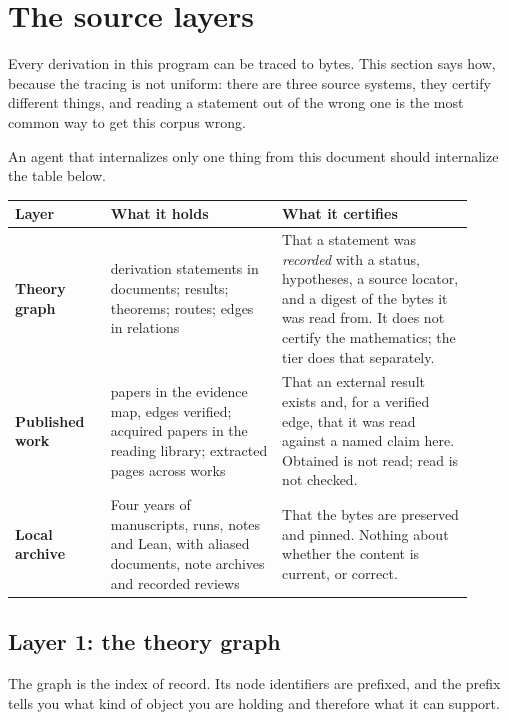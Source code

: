 \section{The source layers}
\label{sec:sources}

Every derivation in this program can be traced to bytes. This section
says how, because the tracing is not uniform: there are three source
systems, they certify different things, and reading a statement out of
the wrong one is the most common way to get this corpus wrong.

An agent that internalizes only one thing from this document should
internalize the table below.

\begin{center}
\begin{tabular}{@{}p{0.19\linewidth} p{0.34\linewidth} p{0.38\linewidth}@{}}
\toprule
Layer & What it holds & What it certifies \\
\midrule
\textbf{Theory graph} &
\DerivStatements{} derivation statements in \CiteDocs{} documents;
\ResTotal{} results; \LeanTotal{} theorems; \RouteTotal{} routes;
\GraphEdges{} edges in \GraphEdgeKinds{} relations &
That a statement was \emph{recorded} with a status, hypotheses, a
source locator, and a digest of the bytes it was read from. It does
not certify the mathematics; the tier does that separately. \\
\addlinespace
\textbf{Published work} &
\LitPapers{} papers in the evidence map, \LitVerified{} edges verified;
\LibraryPapers{} acquired papers in the reading library;
\ExtractedPages{} extracted pages across \ExtractedWorks{} works &
That an external result exists and, for a verified edge, that it was
read against a named claim here. Obtained is not read; read is not
checked. \\
\addlinespace
\textbf{Local archive} &
Four years of manuscripts, runs, notes and Lean, with
\AliasCount{} aliased documents, \NoteArchives{} note archives and
\NoteReviews{} recorded reviews &
That the bytes are preserved and pinned. Nothing about whether the
content is current, or correct. \\
\bottomrule
\end{tabular}
\end{center}

\subsection{Layer 1: the theory graph}

The graph is the index of record. Its node identifiers are prefixed,
and the prefix tells you what kind of object you are holding and
therefore what it can support.

